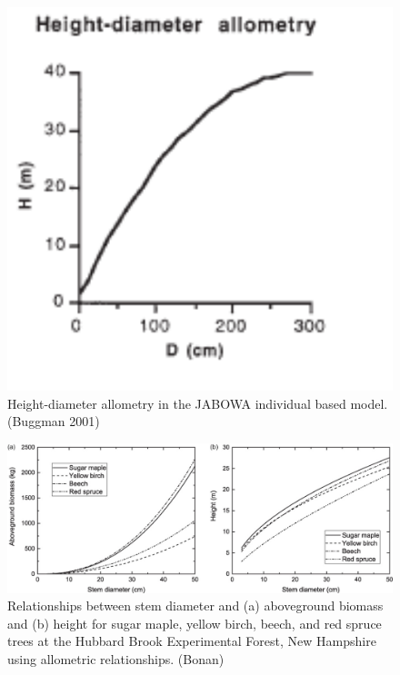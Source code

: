 \documentclass[12pt,oneside]{book}
\begin{document}
\begin{figure}

{\centering \includegraphics[width=0.8\linewidth]{figures/chap6/f620_HD_allom} 

}

\caption{Height-diameter allometry in the JABOWA individual based model.(Buggman 2001)}\label{fig:f620}
\end{figure}

\begin{figure}

{\centering \includegraphics[width=0.8\linewidth]{figures/chap6/f621_BD_allom} 

}

\caption{Relationships between stem diameter and (a) aboveground biomass and (b) height for sugar maple, yellow birch, beech, and red spruce trees at the Hubbard Brook Experimental Forest, New Hampshire using allometric relationships. (Bonan)}\label{fig:f621}
\end{figure}
\end{document}
